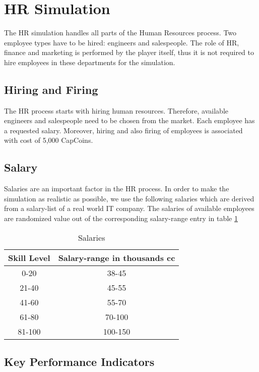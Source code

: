 \section{HR Simulation}
\label{sec:HRsim}
The HR simulation handles all parts of the Human Resources process. Two employee types have to be hired: engineers and salespeople. The role of HR, finance and marketing is performed by the player itself, thus it is not required to hire employees in these departments for the simulation. 

\subsection{Hiring and Firing}
The HR process starts with hiring human resources. Therefore, available engineers and salespeople need to be chosen from the market. Each employee has a requested salary. Moreover, hiring and also firing of employees is associated with cost of 5,000 CapCoins. \cite{recruiterbox}

\subsection{Salary}
Salaries are an important factor in the HR process. In order to make the simulation as realistic as possible, we use the following salaries which are derived from a salary-list of a real world IT company. The salaries of available employees are randomized value out of the corresponding salary-range entry in table \ref{tab:Salaries}

\begin{table}[ht]
    \centering
\begin{tabular}{c|c}
    \hline
     \textbf{Skill Level} & \textbf{Salary-range in thousands cc} \\
     \hline \hline
     0-20 & 38-45  \\
     21-40 & 45-55 \\
     41-60 & 55-70  \\
     61-80 & 70-100  \\
     81-100 & 100-150  \\
     \hline

\end{tabular}
\caption{Salaries}
    \label{tab:Salaries}
\end{table}

\subsection{Key Performance Indicators}
\label{sub:KPI}

